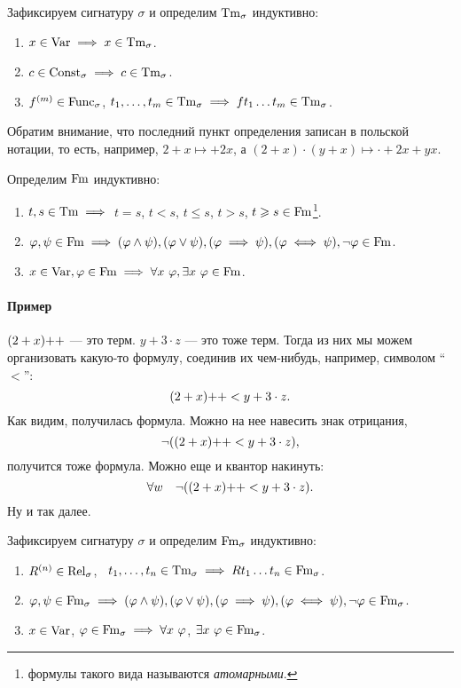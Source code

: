 \begin{definition}
    Зафиксируем сигнатуру $\sigma$ и определим $\mathrm{Tm}_{\sigma}$ индуктивно:
    \begin{enumerate}
        \item $x \in \mathrm{Var} \implies x \in \mathrm{Tm}_{\sigma}$.
        \item $c \in \mathrm{Const}_{\sigma} \implies c \in \mathrm{Tm}_{\sigma}$.
        \item $f^{(m)} \in \mathrm{Func}_{\sigma}$, $t_{1}, \ldots, t_{m} \in \mathrm{Tm}_{\sigma} \implies f t_{1} \ldots t_{m} \in \mathrm{Tm}_{\sigma}$.
    \end{enumerate}
\end{definition}
Обратим внимание, что последний пункт определения записан в польской нотации, то есть, например, $2 + x \mapsto +2x$, а $(2 + x) \cdot (y + x) \mapsto \cdot +2x +yx$.

\begin{definition}
    Определим $\mathrm{Fm}$ индуктивно:
    \begin{enumerate}
        \item $t, s \in \mathrm{Tm} \implies$ $t = s$, $t < s$, $t \leqslant s$, $t > s$, $t \geqslant s \in \mathrm{Fm}$\footnote{формулы такого вида называются {\it атомарными}.}.
        \item $\varphi, \psi \in \mathrm{Fm} \implies (\varphi \land \psi), (\varphi \lor \psi), (\varphi \implies \psi), (\varphi \iff \psi), \neg \varphi \in \mathrm{Fm}$.
        \item $x \in \mathrm{Var}, \varphi \in \mathrm{Fm} \implies \forall x~\varphi, \exists x~\varphi \in \mathrm{Fm}$.
    \end{enumerate}
\end{definition}

\paragraph{Пример} $(2 + x){++}$ --- это терм.
$y + 3 \cdot z$ --- это тоже терм.
Тогда из них мы можем организовать какую-то формулу, соединив их чем-нибудь, например, символом \enquote{$<$}:
$$
    (2 + x){++} < y + 3 \cdot z.
$$
Как видим, получилась формула.
Можно на нее навесить знак отрицания,
$$
    \neg ((2 + x){++} < y + 3 \cdot z),
$$
получится тоже формула.
Можно еще и квантор накинуть:
$$
    \forall w \quad \neg ((2 + x){++} < y + 3 \cdot z).
$$
Ну и так далее.

\begin{definition}
    Зафиксируем сигнатуру $\sigma$ и определим $\mathrm{Fm}_{\sigma}$ индуктивно:
    \begin{enumerate}
        \item $R^{(n)} \in \mathrm{Rel}_{\sigma}$, \ $t_{1}, \ldots, t_{n} \in \mathrm{Tm}_{\sigma} \implies R t_{1} \ldots t_{n} \in \mathrm{Fm}_{\sigma}$.
        \item $\varphi, \psi \in \mathrm{Fm}_{\sigma} \implies (\varphi \land \psi), (\varphi \lor \psi), (\varphi \implies \psi), (\varphi \iff \psi), \neg \varphi \in \mathrm{Fm}_{\sigma}$.
        \item $x \in \mathrm{Var}$, $\varphi \in \mathrm{Fm}_{\sigma} \implies \forall x~\varphi$, $\exists x~\varphi \in \mathrm{Fm}_{\sigma}$.
    \end{enumerate}
\end{definition}


